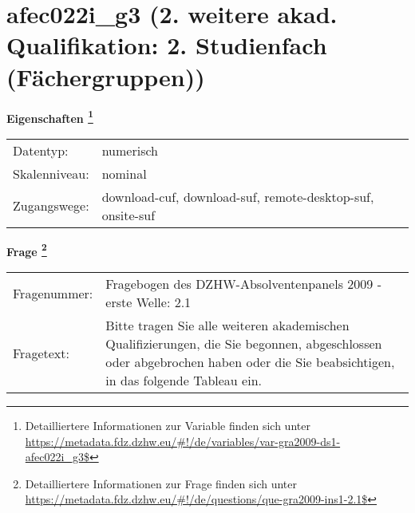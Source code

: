 
    \setcounter{footnote}{0}

    \vspace*{-1.8cm}
	\section{afec022i\_g3 (2. weitere akad. Qualifikation: 2. Studienfach (Fächergruppen))}
	\label{section:afec022i_g3}



    \vspace*{0.5cm}
    \noindent\textbf{Eigenschaften
	\footnote{Detailliertere Informationen zur Variable finden sich unter
		\url{https://metadata.fdz.dzhw.eu/\#!/de/variables/var-gra2009-ds1-afec022i_g3$}}}\\
	\begin{tabularx}{\hsize}{@{}lX}
	Datentyp: & numerisch \\
	Skalenniveau: & nominal \\
	Zugangswege: &
	  download-cuf, 
	  download-suf, 
	  remote-desktop-suf, 
	  onsite-suf
 \\
    \end{tabularx}



				\vspace*{0.5cm}
                \noindent\textbf{Frage
	                \footnote{Detailliertere Informationen zur Frage finden sich unter
		              \url{https://metadata.fdz.dzhw.eu/\#!/de/questions/que-gra2009-ins1-2.1$}}}\\
				\begin{tabularx}{\hsize}{@{}lX}
					Fragenummer: &
					  Fragebogen des DZHW-Absolventenpanels 2009 - erste Welle:
					  2.1
 \\
					Fragetext: & Bitte tragen Sie alle weiteren akademischen Qualifizierungen, die Sie begonnen, abgeschlossen oder abgebrochen haben oder die Sie beabsichtigen, in das folgende Tableau ein. \\
				\end{tabularx}





